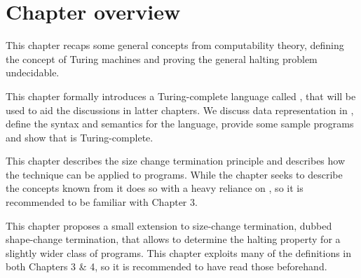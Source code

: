 \section{Chapter overview}

\begin{description}[\setleftmargin{70pt}\setlabelstyle{\bf}]

\item [Chapter 2] This chapter recaps some general concepts from computability
theory, defining the concept of Turing machines and proving the general halting
problem undecidable.

\item [Chapter 3] This chapter formally introduces a Turing-complete language
called \D{}, that will be used to aid the discussions in latter chapters. We
discuss data representation in \D{}, define the syntax and semantics for the
language, provide some sample programs and show that \D{} is Turing-complete.

\item [Chapter 4] This chapter describes the size change termination principle
and describes how the technique can be applied to \D{} programs. While the
chapter seeks to describe the concepts known from \cite{size-change} it does so
with a heavy reliance on \D{}, so it is recommended to be familiar with Chapter
3.

\item [Chapter 5] This chapter proposes a small extension to size-change
termination, dubbed shape-change termination, that allows to determine the
halting property for a slightly wider class of programs. This chapter exploits
many of the definitions in both Chapters 3 \& 4, so it is recommended to have
read those beforehand.

\end{description}
